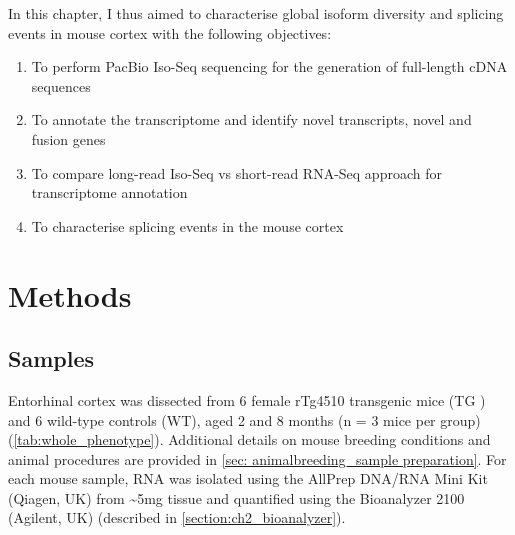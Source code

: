 \newpage
In this chapter, I thus aimed to characterise global isoform diversity and splicing events in mouse cortex with the following objectives:
\begin{enumerate}
	\item To perform PacBio Iso-Seq sequencing for the generation of full-length cDNA sequences 
	\item To annotate the transcriptome and identify novel transcripts, novel and fusion genes  
	\item To compare long-read Iso-Seq vs short-read RNA-Seq approach for transcriptome annotation 
	\item To characterise splicing events in the mouse cortex  	
\end{enumerate} 

\section{Methods}
\subsection{Samples}
Entorhinal cortex was dissected from 6 female rTg4510 transgenic mice (TG ) and 6 wild-type controls (WT), aged 2 and 8 months (n = 3 mice per group) (\cref{tab:whole_phenotype}). Additional details on mouse breeding conditions and animal procedures are provided in \cref{sec: animalbreeding_sample preparation}. For each mouse sample, RNA was isolated using the AllPrep DNA/RNA Mini Kit (Qiagen, UK) from \textasciitilde5mg tissue and quantified using the Bioanalyzer 2100 (Agilent, UK) (described in \cref{section:ch2_bioanalyzer}). 


